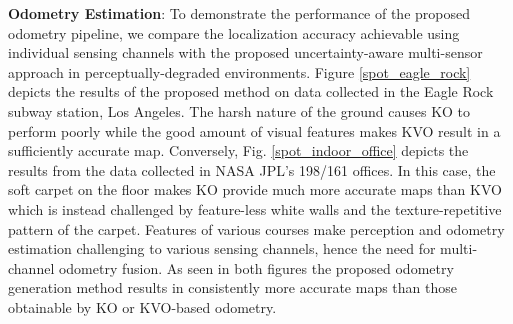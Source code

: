 \documentclass[letterpaper, 10pt, conference]{ieeeconf}      %
\newcommand{\ph}[1]{{\textbf{#1}:}} %
\newcommand{\rev}[1]{{\color{blue} #1 }} %
\begin{document}










\ph{Odometry Estimation}
\rev{To demonstrate the performance of the proposed odometry pipeline, we compare the localization accuracy achievable using individual sensing channels with the proposed uncertainty-aware multi-sensor approach in perceptually-degraded environments. Figure \ref{spot_eagle_rock} depicts the results of the proposed method on data collected in the Eagle Rock subway station, Los Angeles. The harsh nature of the ground causes KO to perform poorly while the good amount of visual features makes KVO result in a sufficiently accurate map. Conversely, Fig. \ref{spot_indoor_office} depicts the results from the data collected in NASA JPL's 198/161 offices. In this case, the soft carpet on the floor makes KO provide much more accurate maps than KVO which is instead challenged by feature-less white walls and the texture-repetitive pattern of the carpet. Features of various courses make perception and odometry estimation challenging to various sensing channels, hence the need for multi-channel odometry fusion. As seen in both figures the proposed odometry generation method results in consistently more accurate maps than those obtainable by KO or KVO-based odometry.}




\end{document}

